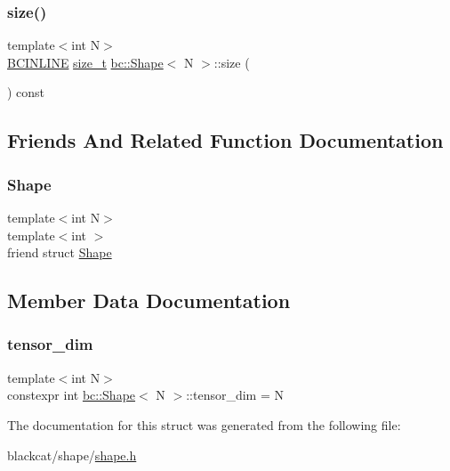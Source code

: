 \mbox{\label{structbc_1_1Shape_ad060b7cb938ac27e710901026ac46a01}} 
\subsubsection{\texorpdfstring{size()}{size()}}
{\footnotesize\ttfamily template$<$int N$>$ \\
\hyperlink{common_8h_a6699e8b0449da5c0fafb878e59c1d4b1}{B\+C\+I\+N\+L\+I\+NE} \hyperlink{structbc_1_1Shape_a63f974ebdb0e3755ef3140b17abcf235}{size\+\_\+t} \hyperlink{structbc_1_1Shape}{bc\+::\+Shape}$<$ N $>$\+::size (\begin{DoxyParamCaption}{ }\end{DoxyParamCaption}) const\hspace{0.3cm}{\ttfamily [inline]}}



\subsection{Friends And Related Function Documentation}
\mbox{\label{structbc_1_1Shape_ab0bde87b11c5c08fec2f2325317820de}} 
\subsubsection{\texorpdfstring{Shape}{Shape}}
{\footnotesize\ttfamily template$<$int N$>$ \\
template$<$int $>$ \\
friend struct \hyperlink{structbc_1_1Shape}{Shape}\hspace{0.3cm}{\ttfamily [friend]}}



\subsection{Member Data Documentation}
\mbox{\label{structbc_1_1Shape_a1f75fffa8b4aec4405025de308adb169}} 
\subsubsection{\texorpdfstring{tensor\+\_\+dim}{tensor\_dim}}
{\footnotesize\ttfamily template$<$int N$>$ \\
constexpr int \hyperlink{structbc_1_1Shape}{bc\+::\+Shape}$<$ N $>$\+::tensor\+\_\+dim = N\hspace{0.3cm}{\ttfamily [static]}}



The documentation for this struct was generated from the following file\+:\begin{DoxyCompactItemize}
\item 
blackcat/shape/\hyperlink{shape_2shape_8h}{shape.\+h}\end{DoxyCompactItemize}
